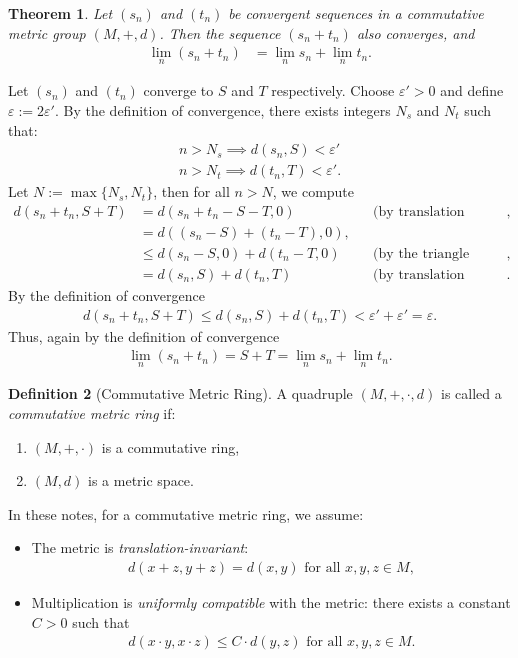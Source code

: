 \documentclass{amsart}
\numberwithin{equation}{section}
\let\oldendproof\endproof
\renewenvironment{proof}[1][\proofname]{%
  \setcounter{case}{0}
  \setcounter{step}{0}
  \oldproof[#1]%
}{\oldendproof}
\theoremstyle{plain}
\newtheorem{theorem}{Theorem}[section]
\theoremstyle{definition}
\newtheorem{definition}[theorem]{Definition}
\theoremstyle{remark}
\begin{document}
\begin{theorem}
  Let $(s_n)$ and $(t_n)$ be convergent sequences in a commutative metric group $(M, +, d)$. Then the sequence $(s_n + t_n)$ also converges, and
  \begin{align*}
    \lim_n (s_n + t_n) &= \lim_n s_n + \lim_n t_n.
  \end{align*}
\end{theorem}
\begin{proof}
  Let $(s_n)$ and $(t_n)$ converge to $S$ and $T$ respectively.
  Choose $\varepsilon'>0$ and define $\varepsilon:= 2\varepsilon'$.
  By the definition of convergence, there exists integers $N_s$ and $N_t$ such that:
  \begin{align*}
    n > N_s \implies d(s_n, S) < \varepsilon'\\
    n > N_t \implies d(t_n, T) < \varepsilon'.
  \end{align*}
  Let $N:= \max \{ N_s, N_t\}$, then for all $n>N$, we compute
  \begin{align*}
    d(s_n+t_n, S+T) &= d(s_n+t_n-S-T,0)&&\text{(by translation invariance)},\\
    &= d((s_n-S)+(t_n-T),0),\\
    &\leq d(s_n-S, 0) + d(t_n-T, 0)&&\text{(by the triangle identity)},\\
    &= d(s_n, S) + d(t_n, T)&&\text{(by translation invariance)}.
  \end{align*}
  By the definition of convergence
  \begin{align*}
    d(s_n+t_n, S+T) \leq d(s_n, S) + d(t_n, T) < \varepsilon ' + \varepsilon' = \varepsilon.
  \end{align*}
  Thus, again by the definition of convergence
  \begin{align*}
    \lim_n (s_n+t_n) = S+T = \lim_n s_n + \lim_n t_n.
  \end{align*}
\end{proof}

\begin{definition}[Commutative Metric Ring]
  A quadruple $(M, +, \cdot, d)$ is called a \emph{commutative metric ring} if:
  \begin{enumerate}
    \item $(M, +, \cdot)$ is a commutative ring,
    \item $(M, d)$ is a metric space.
  \end{enumerate}
  In these notes, for a commutative metric ring, we assume:
  \begin{itemize}
    \item The metric is \emph{translation-invariant}:
    \begin{align*}
      d(x + z, y + z) = d(x, y)\text{ for all } x, y, z \in M,
    \end{align*}
    \item Multiplication is \emph{uniformly compatible} with the metric: there exists a constant $C > 0$ such that
    \begin{align*}
      d(x \cdot y, x \cdot z) \leq C \cdot d(y, z)\text{ for all } x, y, z \in M.
    \end{align*}
  \end{itemize}
\end{definition}
\end{document}
